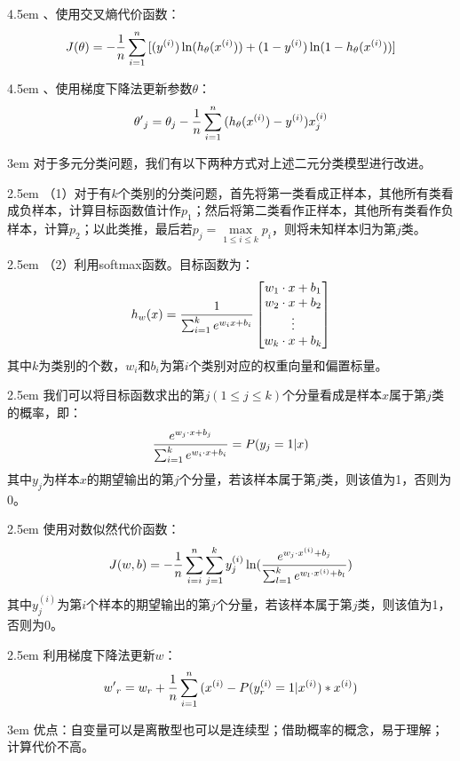 \documentclass[a4paper, 11pt]{article}
\begin{document}
\begin{CJK*}{GBK}{song}
\hangindent 4.5em
\quad\quad{}、使用交叉熵代价函数：
$$J(\theta ) =  - {1 \over n}\sum\limits_{i = 1}^n {[({y^{(i)}})} \ln ({h_\theta }({x^{(i)}})) + (1 - {y^{(i)}})\ln (1 - {h_\theta }({x^{(i)}}))]$$

\hangindent 4.5em
\quad\quad{}、使用梯度下降法更新参数$\theta$：
$${{\theta '}_j} = {\theta _j} - {1 \over n}\sum\limits_{i = 1}^n {({h_\theta }({x^{(i)}}) - {y^{(i)}})} x_j^{(i)}$$

\hangindent 3em
对于多元分类问题，我们有以下两种方式对上述二元分类模型进行改进。

\hangindent 2.5em
（1）对于有$k$个类别的分类问题，首先将第一类看成正样本，其他所有类看成负样本，计算目标函数值计作$p_1$；然后将第二类看作正样本，其他所有类看作负样本，计算$p_2$；以此类推，最后若${p_j} = \mathop {\max }\limits_{1 \le i \le k} {p_i}$，则将未知样本归为第$j$类。

\hangindent 2.5em
（2）利用softmax函数。目标函数为：
$${h_w}(x) = {1 \over {\sum\nolimits_{i = 1}^k {{e^{{w_i}x + {b_i}}}} }}
\left[\begin{matrix}
{w_1} \cdot x + {b_1} \\
{w_2} \cdot x + {b_2}\\
\vdots\\
{w_k} \cdot x + {b_k}
\end{matrix}\right]
$$
其中$k$为类别的个数，${w_i}$和$b_i$为第$i$个类别对应的权重向量和偏置标量。

\hangindent 2.5em
我们可以将目标函数求出的第$j(1 \le j \le k)$个分量看成是样本$x$属于第$j$类的概率，即：
$${{{e^{{w_j} \cdot x + {b_j}}}} \over {\sum\nolimits_{i = 1}^k {{e^{{w_i} \cdot x + {b_i}}}} }} = P({y_j} = 1|x)$$
其中${y_j}$为样本$x$的期望输出的第$j$个分量，若该样本属于第$j$类，则该值为1，否则为0。

\hangindent 2.5em
使用对数似然代价函数：
$$J(w,b) =  - {1 \over n}\sum\limits_{i = i}^n {\sum\limits_{j = 1}^k {y_j^{(i)}\ln } } ({{{e^{{w_j}\cdot{x^{(i)}} + {b_j}}}} \over {\sum\nolimits_{l = 1}^k {{e^{{w_l}\cdot{x^{(i)}} + {b_l}}}} }})$$
其中${y_j^{(i)}}$为第$i$个样本的期望输出的第$j$个分量，若该样本属于第$j$类，则该值为1，否则为0。

\hangindent 2.5em
利用梯度下降法更新$w$：
$${{w'}_r} = {w_r} + {1 \over n}\sum\limits_{i = 1}^n {({x^{(i)}} - P(y_r^{(i)} = 1|{x^{(i)}})*{x^{(i)}})} $$

\hangindent 3em
优点：自变量可以是离散型也可以是连续型；借助概率的概念，易于理解；计算代价不高。


\end{CJK*}
\end{document}
